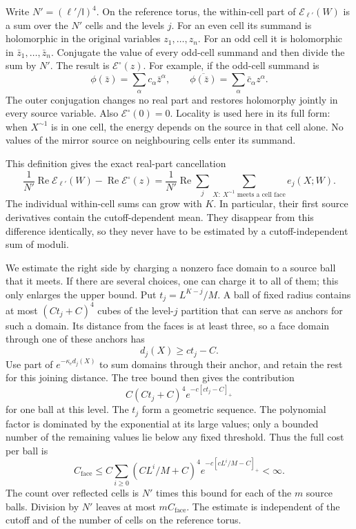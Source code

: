 \documentclass[11pt,letterpaper,reqno]{amsart}
\theoremstyle{definition}
\theoremstyle{remark}
\begin{document}
Write $N'=(\ell'/\mathsf l)^4$. On the reference torus, the
within-cell part of $\mathcal E_{\ell'}(W)$ is a sum over the
$N'$ cells and the levels $j$. For an even cell its summand is
holomorphic in the original variables $z_1,\ldots,z_n$. For an
odd cell it is holomorphic in $\bar z_1,\ldots,\bar z_n$.
Conjugate the value of every odd-cell summand and then divide the
sum by $N'$. The result is $\mathcal E^\circ(z)$. For example,
if the odd-cell summand is
\[
 \phi(\bar z)=\sum_\alpha c_\alpha\bar z^\alpha,
 \qquad
 \overline{\phi(\bar z)}
                  =\sum_\alpha\bar c_\alpha z^\alpha.
\]
The outer conjugation changes no real part and restores holomorphy
jointly in every source variable. Also $\mathcal E^\circ(0)=0$.
Locality is used here in its full form: when $X^{\sim1}$ is in
one cell, the energy depends on the source in that cell alone. No
values of the mirror source on neighbouring cells enter its summand.

This definition gives the exact real-part cancellation
\[
 \frac1{N'}\operatorname{Re}\mathcal E_{\ell'}(W)
              -\operatorname{Re}\mathcal E^\circ(z)
  =\frac1{N'}\operatorname{Re}
       \sum_j\sum_{X:\ X^{\sim1}\text{ meets a cell face}}
                                                   e_j(X;W).
\]
The individual within-cell sums can grow with $K$. In particular,
their first source derivatives contain the cutoff-dependent mean.
They disappear from this difference identically, so they never have
to be estimated by a cutoff-independent sum of moduli.

We estimate the right side by charging a nonzero face domain to a
source ball that it meets. If there are several choices, one can
charge it to all of them; this only enlarges the upper bound. Put
$t_j=L^{K-j}/M$. A ball of fixed radius contains at most
$(Ct_j+C)^4$ cubes of the level-$j$ partition that can serve as
anchors for such a domain. Its distance from the faces is at least
three, so a face domain through one of these anchors has
\[
 d_j(X)\ge ct_j-C.
\]
Use part of $e^{-\kappa_ed_j(X)}$ to sum domains through their
anchor, and retain the rest for this joining distance. The tree
bound then gives the contribution
\[
 C(Ct_j+C)^4e^{-c[ct_j-C]_+}
\]
for one ball at this level. The $t_j$ form a geometric sequence.
The polynomial factor is dominated by the exponential at its large
values; only a bounded number of the remaining values lie below any
fixed threshold. Thus the full cost per ball is
\[
 C_{\mathrm{face}}
 \le C\sum_{i\ge0}(CL^i/M+C)^4
                           e^{-c[cL^i/M-C]_+}<\infty.
\]
The count over reflected cells is $N'$ times this bound for each
of the $m$ source balls. Division by $N'$ leaves at most
$mC_{\mathrm{face}}$. The estimate is independent of the cutoff
and of the number of cells on the reference torus.
\end{document}
